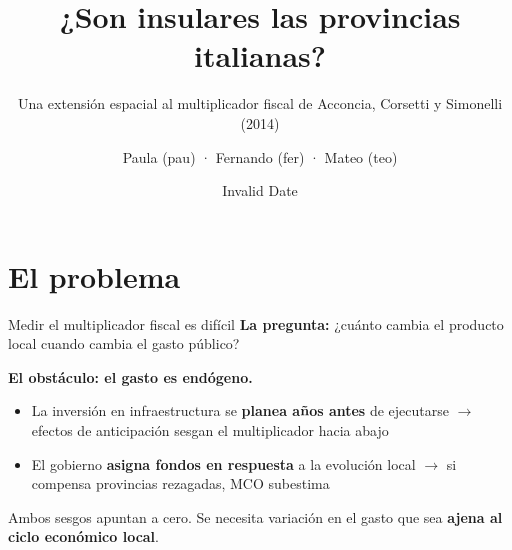 \documentclass[
  10pt,
  ignorenonframetext,
  aspectratio=169,
  spanish,
]{beamer}
\title{\texorpdfstring{¿Son insulares las provincias
italianas?}{¿Son insulares las provincias italianas?}}
\subtitle{\texorpdfstring{Una extensión espacial al multiplicador fiscal
de Acconcia, Corsetti y Simonelli
(2014)}{Una extensión espacial al multiplicador fiscal de Acconcia, Corsetti y Simonelli (2014)}}
\author{Paula (pau) · Fernando (fer) · Mateo (teo)}
\date{Invalid Date}
\institute{Econometría Avanzada II --- Universidad EAFIT}
\providecommand{\tightlist}{%
  \setlength{\itemsep}{0pt}\setlength{\parskip}{0pt}}
\begin{document}
\frame{\titlepage}


\section{El problema}\label{el-problema}

\begin{frame}{Medir el multiplicador fiscal es difícil}
\protect{}\label{medir-el-multiplicador-fiscal-es-difuxedcil}
\textbf{La pregunta:} ¿cuánto cambia el producto local cuando cambia el
gasto público?

\vspace{0.4cm}

\textbf{El obstáculo: el gasto es endógeno.}

\vspace{0.2cm}

\begin{itemize}
\tightlist
\item
  La inversión en infraestructura se \textbf{planea años antes} de
  ejecutarse \newline \(\rightarrow\) efectos de anticipación sesgan el
  multiplicador hacia abajo
\item
  El gobierno \textbf{asigna fondos en respuesta} a la evolución local
  \newline \(\rightarrow\) si compensa provincias rezagadas, MCO
  subestima
\end{itemize}

\vspace{0.4cm}

Ambos sesgos apuntan a cero. Se necesita variación en el gasto que sea
\textbf{ajena al ciclo económico local}.
\end{frame}
\end{document}
